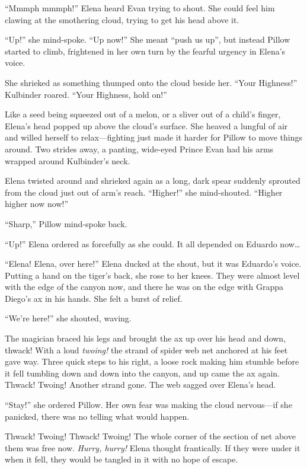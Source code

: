 \documentclass[10pt]{book}
\begin{document}
``Mmmph mmmph!'' Elena heard Evan trying to shout.  She could feel him clawing at the smothering cloud, trying to get his head above it.

``Up!'' she mind-spoke.  ``Up now!''  She meant ``push us up'', but instead Pillow started to climb, frightened in her own turn by the fearful urgency in Elena's voice.

She shrieked as something thumped onto the cloud beside her.  ``Your Highness!'' Kulbinder roared.  ``Your Highness, hold on!''

Like a seed being squeezed out of a melon, or a sliver out of a child's finger, Elena's head popped up above the cloud's surface.  She heaved a lungful of air and willed herself to relax---fighting just made it harder for Pillow to move things around.  Two strides away, a panting, wide-eyed Prince Evan had his arms wrapped around Kulbinder's neck.

Elena twisted around and shrieked again as a long, dark spear suddenly sprouted from the cloud just out of arm's reach.  ``Higher!'' she mind-shouted.  ``Higher higher now now!''

``Sharp,'' Pillow mind-spoke back.

``Up!'' Elena ordered as forcefully as she could.  It all depended on Eduardo now{\ldots}

``Elena!  Elena, over here!''  Elena ducked at the shout, but it was Eduardo's voice.  Putting a hand on the tiger's back, she rose to her knees.  They were almost level with the edge of the canyon now, and there he was on the edge with Grappa Diego's ax in his hands.  She felt a burst of relief.

``We're here!'' she shouted, waving.

The magician braced his legs and brought the ax up over his head and down, thwack!  With a loud \emph{twoing!} the strand of spider web net anchored at his feet gave way.  Three quick steps to his right, a loose rock making him stumble before it fell tumbling down and down into the canyon, and up came the ax again.  Thwack!  Twoing!  Another strand gone.  The web sagged over Elena's head.

``Stay!'' she ordered Pillow.  Her own fear was making the cloud nervous---if she panicked, there was no telling what would happen.

Thwack!  Twoing!  Thwack!  Twoing!  The whole corner of the section of net above them was free now.  \emph{Hurry, hurry!} Elena thought frantically.  If they were under it when it fell, they would be tangled in it with no hope of escape.
\end{document}
